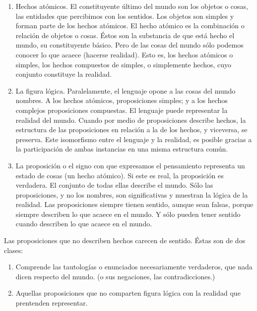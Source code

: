 \documentclass[a4paper, 11pt, twocolumn, spanish]{article}
\begin{document}
\begin{enumerate}
\item Hechos atómicos. El constituyente último del mundo son los
objetos o cosas, las entidades que percibimos con los
sentidos. Los objetos son simples y forman parte de los hechos
atómicos. El hecho atómico es la combinación o relación de
objetos o cosas. Éstos son la substancia de que está hecho el
mundo, su constituyente básico. Pero de las cosas del mundo sólo
podemos conocer lo que acaece (hacerse realidad). Esto es, los
hechos atómicos o simples, los hechos compuestos de simples, o
simplemente hechos, cuyo conjunto constituye la realidad.
\item La figura lógica. Paralelamente, el lenguaje opone a las cosas
del mundo nombres. A los hechos atómicos, proposiciones simples;
y a los hechos complejos proposiciones compuestas. El lenguaje
puede representar la realidad del mundo. Cuando por medio de
proposiciones describe hechos, la estructura de las proposiciones
en relación a la de los hechos, y viceversa, se preserva. Este
isomorfismo entre el lenguaje y la realidad, es posible gracias a
la participación de ambas instancias en una misma estructura
común.
\item La proposición o el signo con que expresamos el pensamiento
representa un estado de cosas (un hecho atómico). Si este es
real, la proposición es verdadera. El conjunto de todas ellas
describe el mundo. Sólo las proposiciones, y no los nombres, son
significativas y muestran la lógica de la realidad. Las
proposiciones siempre tienen sentido, aunque sean falsas, porque
siempre describen lo que acaece en el mundo. Y sólo pueden tener
sentido cuando describen lo que acaece en el mundo.
\end{enumerate}

Las proposiciones que no describen hechos carecen de sentido. Éstas
son de dos clases:
\begin{enumerate}
\item Comprende las tautologías o enunciados necesariamente verdaderos,
que nada dicen respecto del mundo. (o sus negaciones, las
contradicciones.)
\item Aquellas proposiciones que no comparten figura lógica con la
realidad que prentenden representar.
\end{enumerate}
\end{document}
